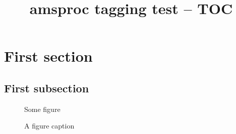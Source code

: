 \documentclass{amsproc}
\title{amsproc tagging test -- TOC}
\begin{document}
\tableofcontents
\listoffigures

\section{First section}
\subsection{First subsection}
\begin{figure}
Some figure
\caption{A figure caption}
\end{figure}
\end{document}
